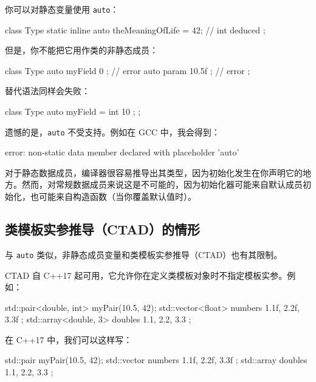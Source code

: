 你可以对静态变量使用 \texttt{auto}：


\begin{codebox}[cpp]
class Type {
    static inline auto theMeaningOfLife = 42; // int deduced
};
\end{codebox}

但是，你不能把它用作类的非静态成员：

\begin{codebox}[cpp]
class Type {
    auto myField { 0 };
    // error
    auto param { 10.5f }; // error
};
\end{codebox}

替代语法同样会失败：

\begin{codebox}[cpp]
class Type {
    auto myField = int { 10 };
};
\end{codebox}

遗憾的是，\texttt{auto} 不受支持。例如在 GCC 中，我会得到：

\begin{codebox}[cpp]
error: non-static data member declared with placeholder 'auto'
\end{codebox}

对于静态数据成员，编译器很容易推导出其类型，因为初始化发生在你声明它的地方。然而，对常规数据成员来说这是不可能的，因为初始化器可能来自默认成员初始化，也可能来自构造函数（当你覆盖默认值时）。

\subsection{类模板实参推导（CTAD）的情形}

与 \texttt{auto} 类似，非静态成员变量和类模板实参推导（CTAD）也有其限制。

CTAD 自 C++17 起可用，它允许你在定义类模板对象时不指定模板实参。例如：


\begin{codebox}[cpp]
std::pair<double, int> myPair(10.5, 42);
std::vector<float> numbers { 1.1f, 2.2f, 3.3f };
std::array<double, 3> doubles { 1.1, 2.2, 3.3 };
\end{codebox}

在 C++17 中，我们可以这样写：

\begin{codebox}[cpp]
std::pair myPair(10.5, 42);
std::vector numbers { 1.1f, 2.2f, 3.3f };
std::array doubles { 1.1, 2.2, 3.3 };
\end{codebox}

